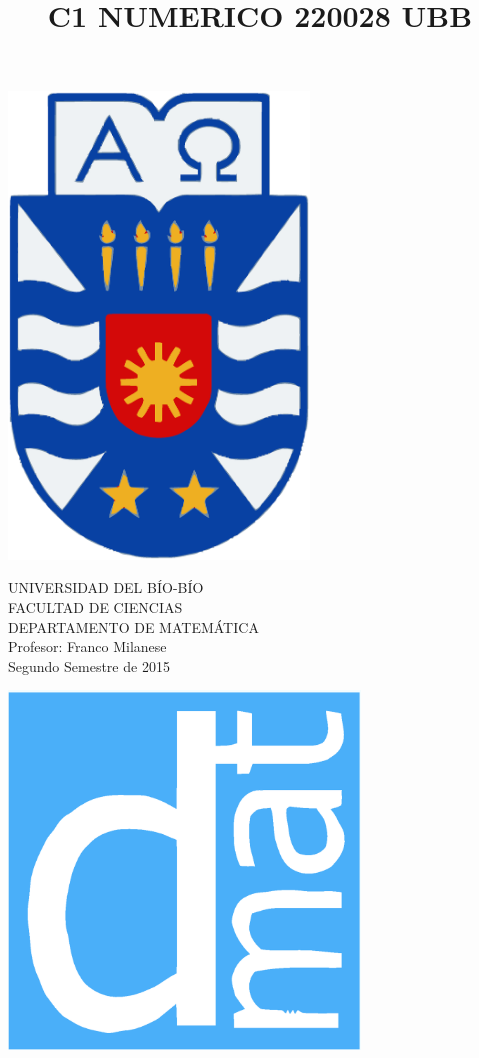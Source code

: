 \documentclass[11pt]{article}
\begin{document}
\title{C1 NUMERICO 220028 UBB}

{\begin{minipage}{2cm}
\hspace*{1cm}\includegraphics[width=0.6\textwidth]{escubo-ubb.eps}
\end{minipage}
\begin{minipage}{12cm}
\small
{\bf \rm 
{
\begin{center}
{\footnotesize UNIVERSIDAD DEL B\'IO-B\'IO} \\
{\scriptsize FACULTAD DE CIENCIAS}  \\
{\scriptsize DEPARTAMENTO DE MATEM\'ATICA}  \\
{\scriptsize Profesor:  Franco Milanese}\\
{\scriptsize Segundo Semestre de 2015}
\end{center}
}}
\end{minipage}}
{\begin{minipage}{2cm}
\hspace*{-0.5cm}\vspace*{-0.05cm}\includegraphics[width=0.7\textwidth]{escudo-dmat.eps}
\end{minipage}}
\end{document}
